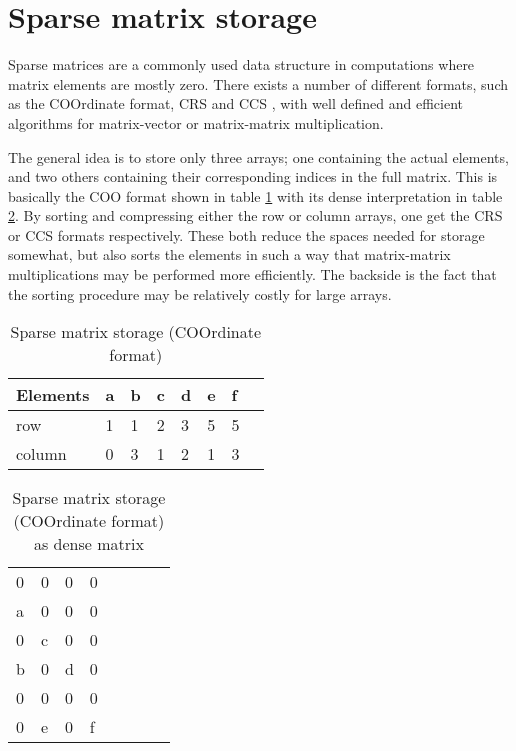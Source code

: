 \FloatBarrier

\section{Sparse matrix storage}

Sparse matrices are a commonly used data structure in computations where matrix elements are mostly zero. There exists a number of different formats, such as the COOrdinate format, CRS and CCS \cite{sparseformats}, with well defined and efficient algorithms for matrix-vector or matrix-matrix multiplication. 

The general idea is to store only three arrays; one containing the actual elements, and two others containing their corresponding indices in the full matrix. This is basically the COO format shown in table \ref{tab:coo_storage} with its dense interpretation in table \ref{tab:coo_storageII}. By sorting and compressing either the row or column arrays, one get the CRS or CCS formats respectively. These both reduce the spaces needed for storage somewhat, but also sorts the elements in such a way that matrix-matrix multiplications may be performed more efficiently. The backside is the fact that the sorting procedure may be relatively costly for large arrays.

\begin{table}[]
\centering
\caption{Sparse matrix storage (COOrdinate format)}
\label{tab:coo_storage}
\begin{tabular}{llllllll}
Elements & a & b & c & d & e & f \\ \hline
row          & 1 & 1 & 2 & 3 & 5 & 5 \\ \hline 
column    & 0 & 3 & 1 & 2 & 1 & 3 \\ \hline
\end{tabular}
\end{table}

\begin{table}[]
\centering
\caption{Sparse matrix storage (COOrdinate format) as dense matrix}
\label{tab:coo_storageII}
\begin{tabular}{llllllll}
0 & 0&0 &0 &  \\
a&0 &0 &0 &  \\
0 &c&0 &0 &  \\
b&0 &d&0 & \\
0 &0  & 0 &0 & \\
0 &e& 0 &f& \\
\end{tabular}
\end{table}

